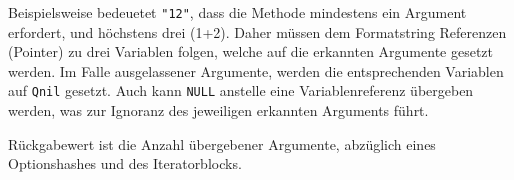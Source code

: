 \noindent Beispielsweise bedeuetet \verb+"12"+, dass die Methode
mindestens ein Argument erfordert, und höchstens drei (1+2). Daher
müssen dem Formatstring Referenzen (Pointer) zu drei Variablen
 folgen, welche auf die erkannten Argumente
gesetzt werden. Im Falle ausgelassener Argumente, werden die
entsprechenden Variablen auf \verb+Qnil+ gesetzt. Auch kann
\verb+NULL+ anstelle eine Variablenreferenz übergeben werden, was zur
Ignoranz des jeweiligen erkannten Arguments führt.

Rückgabewert ist die Anzahl übergebener Argumente,
abzüglich eines Optionshashes und des Iteratorblocks.


